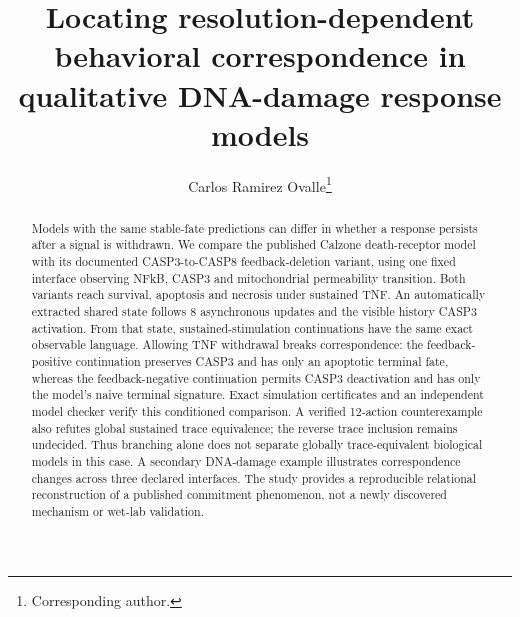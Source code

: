 \documentclass{ws-jbcb}
\numberwithin{equation}{section}
\newcommand{\DRDepth}{8}
\begin{document}
\catchline{}{}{}{}{}

\title{Locating resolution-dependent behavioral correspondence in qualitative DNA-damage response models}

\author{Carlos Ramirez Ovalle\footnote{Corresponding author.}}

\address{Department of Natural Sciences and Mathematics, Pontificia Universidad
Javeriana Cali, Calle 18 No. 118-250, Via a Pance, Cali, Valle del Cauca,
Colombia\\
carlosovalle@javerianacali.edu.co}

\maketitle

\begin{abstract}
Models with the same stable-fate predictions can differ in whether a response
persists after a signal is withdrawn. We compare the published Calzone
death-receptor model with its documented CASP3-to-CASP8 feedback-deletion
variant, using one fixed interface observing NFkB, CASP3 and mitochondrial
permeability transition. Both variants reach survival, apoptosis and necrosis
under sustained TNF. An automatically extracted shared state follows
\DRDepth{} asynchronous updates and the visible history CASP3 activation.
From that state, sustained-stimulation continuations have the same exact
observable language. Allowing TNF withdrawal breaks correspondence: the
feedback-positive continuation preserves CASP3 and has only an apoptotic
terminal fate, whereas the feedback-negative continuation permits CASP3
deactivation and has only the model's naive terminal signature. Exact
simulation certificates and an independent model checker verify this
conditioned comparison. A verified 12-action counterexample also refutes
global sustained trace equivalence; the reverse trace inclusion remains
undecided. Thus branching alone does not separate globally trace-equivalent
biological models in this case. A secondary
DNA-damage example illustrates correspondence changes across three declared
interfaces. The study provides a reproducible relational reconstruction of a
published commitment phenomenon, not a newly discovered mechanism or wet-lab
validation.

\end{abstract}

\end{document}
